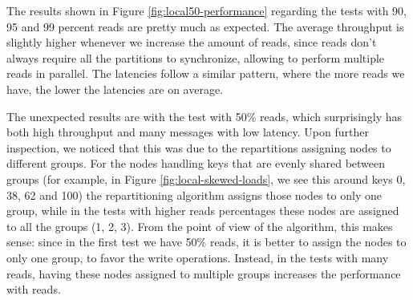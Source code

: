 


The results shown in Figure \ref{fig:local50-performance} regarding the tests with 90, 95 and 99 percent reads are pretty much as expected. The average throughput is slightly higher whenever we increase the amount of reads, since reads don't always require all the partitions to synchronize, allowing to perform multiple reads in parallel. The latencies follow a similar pattern, where the more reads we have, the lower the latencies are on average.

The unexpected results are with the test with 50\% reads, which surprisingly has both high throughput and many messages with low latency. Upon further inspection, we noticed that this was due to the repartitions assigning nodes to different groups. For the nodes handling keys that are evenly shared between groups (for example, in Figure \ref{fig:local-skewed-loads}, we see this around keys 0, 38, 62 and 100) the repartitioning algorithm assigns those nodes to only one group, while in the tests with higher reads percentages these nodes are assigned to all the groups (1, 2, 3). From the point of view of the algorithm, this makes sense: since in the first test we have 50\% reads, it is better to assign the nodes to only one group, to favor the write operations. Instead, in the tests with many reads, having these nodes assigned to multiple groups increases the performance with reads.

